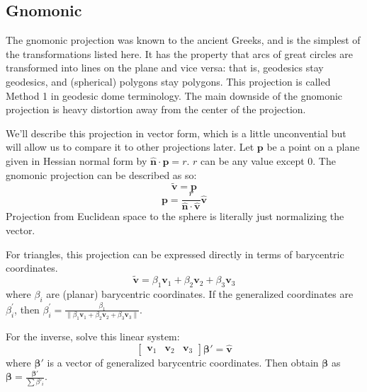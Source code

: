 \documentclass{amsart}[12pt]
\begin{document}
\subsection{Gnomonic}
The gnomonic projection was known to the ancient Greeks, and is the simplest
of the transformations listed here.\cite{snyder87} It has the property that
arcs of great circles are transformed into lines on the plane and vice versa:
that is, geodesics stay geodesics, and (spherical) polygons stay polygons. This
projection is called Method 1 in geodesic dome terminology.\cite{kenner} The
main downside of the gnomonic projection is heavy distortion away from the
center of the projection.

We'll describe this projection in vector form, which is a little unconvential
but will allow us to compare it to other projections later.
Let $\mathbf p$ be a point on a plane given in Hessian normal form by
$\hat{\mathbf n} \cdot \mathbf p = r$. $r$ can be any value except 0.
The gnomonic projection can be described as so:
\begin{equation}
  \widetilde{\mathbf v} = \mathbf p
\end{equation}
\begin{equation}
\mathbf p = \frac{r}
  {\hat{\mathbf n} \cdot \hat{\mathbf v}}\hat{\mathbf v}
\end{equation}
Projection from Euclidean space to the sphere is literally just
normalizing the vector.

For triangles, this projection can be expressed directly in terms
of barycentric coordinates.
\begin{equation}
   \widetilde{\mathbf v} =
   \beta_1 \mathbf v_1 + \beta_2 \mathbf v_2 + \beta_3 \mathbf v_3
\end{equation}
where $\beta_i$ are (planar) barycentric coordinates. If the generalized coordinates are $\beta^\prime_i$, then $\beta^\prime_i = \frac{\beta_1}
{\|\beta_1 \mathbf v_1 + \beta_2 \mathbf v_2 + \beta_3 \mathbf v_3\|}$.

For the inverse, solve this linear system:
\begin{equation}
  \begin{bmatrix}
  \mathbf v_1 & \mathbf v_2 & \mathbf v_3 \end{bmatrix}
   \mathbf{\beta'} = \hat{\mathbf v}
\end{equation}
where $\mathbf{\beta'}$ is a
vector of generalized barycentric coordinates. Then obtain $\mathbf{\beta}$ as
$\mathbf{\beta} = \frac{\mathbf{\beta'}}{\sum{\beta'_i}}$.
\end{document}
